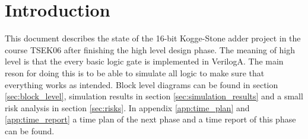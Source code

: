 \section{Introduction}
This document describes the state of the 16-bit Kogge-Stone adder project in the course TSEK06 after finishing the high level design phase. The meaning of high level is that the every basic logic gate is implemented in VerilogA. The main reson for doing this is to be able to simulate all logic to make sure that everything works as intended. Block level diagrams can be found in section \ref{sec:block_level}, simulation results in section \ref{sec:simulation_results} and a small risk analysis in section \ref{sec:risks}. In appendix \ref{app:time_plan} and \ref{app:time_report} a time plan of the next phase and a time report of this phase can be found.

